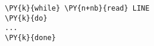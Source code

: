 \begin{Verbatim}[commandchars=\\\{\}]
\PY{k}{while} \PY{n+nb}{read} LINE
\PY{k}{do}
...
\PY{k}{done}
\end{Verbatim}
